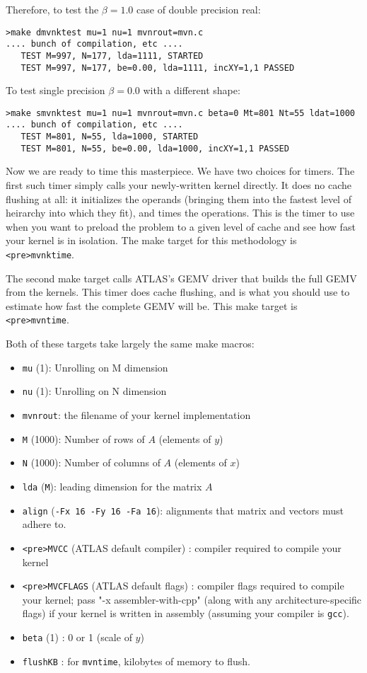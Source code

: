 \documentclass[11pt]{article}
\begin{document}
Therefore, to test the $\beta=1.0$ case of double precision real:
\begin{verbatim}
>make dmvnktest mu=1 nu=1 mvnrout=mvn.c
.... bunch of compilation, etc ....
   TEST M=997, N=177, lda=1111, STARTED
   TEST M=997, N=177, be=0.00, lda=1111, incXY=1,1 PASSED
\end{verbatim}

To test single precision $\beta=0.0$ with a different shape:
\begin{verbatim}
>make smvnktest mu=1 nu=1 mvnrout=mvn.c beta=0 Mt=801 Nt=55 ldat=1000
.... bunch of compilation, etc ....
   TEST M=801, N=55, lda=1000, STARTED
   TEST M=801, N=55, be=0.00, lda=1000, incXY=1,1 PASSED
\end{verbatim}

Now we are ready to time this masterpiece.  We have two choices for timers.
The first such timer simply calls your newly-written kernel directly.
It does no cache flushing at all: it initializes the operands
(bringing them into the fastest level of heirarchy into which they fit),
and times the operations.  This is the timer to use when you want to preload
the problem to a given level of cache and see how fast your kernel is in
isolation.  The make target for this methodology is \verb+<pre>mvnktime+.

The second make target calls ATLAS's GEMV driver that builds the full
GEMV from the kernels.  This timer does cache flushing, and is what you
should use to estimate how fast the complete GEMV will be.  This make target
is \verb+<pre>mvntime+.

Both of these targets take largely the same make macros:
\begin{itemize}
\item \verb+mu+ (1): Unrolling on M dimension
\item \verb+nu+ (1): Unrolling on N dimension
\item \verb+mvnrout+: the filename of your kernel implementation
\item \verb+M+ (1000): Number of rows of $A$ (elements of $y$)
\item \verb+N+ (1000): Number of columns of $A$ (elements of $x$)
\item \verb+lda+ (\verb+M+): leading dimension for the matrix $A$
\item \verb+align+ (\verb+-Fx 16 -Fy 16 -Fa 16+): alignments that
      matrix and vectors must adhere to.
\item \verb+<pre>MVCC+ (ATLAS default compiler) : compiler required
      to compile your kernel
\item \verb+<pre>MVCFLAGS+ (ATLAS default flags) : compiler flags required
      to compile your kernel; pass "-x assembler-with-cpp" (along with any
      architecture-specific flags) if your kernel is written in assembly
      (assuming your compiler is \texttt{gcc}).
\item \verb+beta+ (1) : 0 or 1 (scale of $y$)
\item \verb+flushKB+ : for {\tt mvntime}, kilobytes of memory to flush.
\end{itemize}
\end{document}
